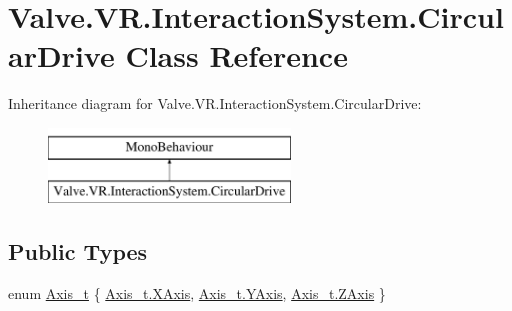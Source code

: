 \hypertarget{class_valve_1_1_v_r_1_1_interaction_system_1_1_circular_drive}{}\section{Valve.\+V\+R.\+Interaction\+System.\+Circular\+Drive Class Reference}
\label{class_valve_1_1_v_r_1_1_interaction_system_1_1_circular_drive}
Inheritance diagram for Valve.\+V\+R.\+Interaction\+System.\+Circular\+Drive\+:\begin{figure}[H]
\begin{center}
\leavevmode
\includegraphics[height=2.000000cm]{class_valve_1_1_v_r_1_1_interaction_system_1_1_circular_drive}
\end{center}
\end{figure}
\subsection*{Public Types}
\begin{DoxyCompactItemize}
\item 
enum \mbox{\hyperlink{class_valve_1_1_v_r_1_1_interaction_system_1_1_circular_drive_a9a0227d59ad0af7a3422fcab9798b5dd}{Axis\+\_\+t}} \{ \mbox{\hyperlink{class_valve_1_1_v_r_1_1_interaction_system_1_1_circular_drive_a9a0227d59ad0af7a3422fcab9798b5ddaf37dd7d4e7b7d1020e931480f0d8f168}{Axis\+\_\+t.\+X\+Axis}}, 
\mbox{\hyperlink{class_valve_1_1_v_r_1_1_interaction_system_1_1_circular_drive_a9a0227d59ad0af7a3422fcab9798b5dda2682f2c068498276c0833008c2061603}{Axis\+\_\+t.\+Y\+Axis}}, 
\mbox{\hyperlink{class_valve_1_1_v_r_1_1_interaction_system_1_1_circular_drive_a9a0227d59ad0af7a3422fcab9798b5ddaa2832ffb7897e88212c65ce756aa3904}{Axis\+\_\+t.\+Z\+Axis}}
 \}
\end{DoxyCompactItemize}
